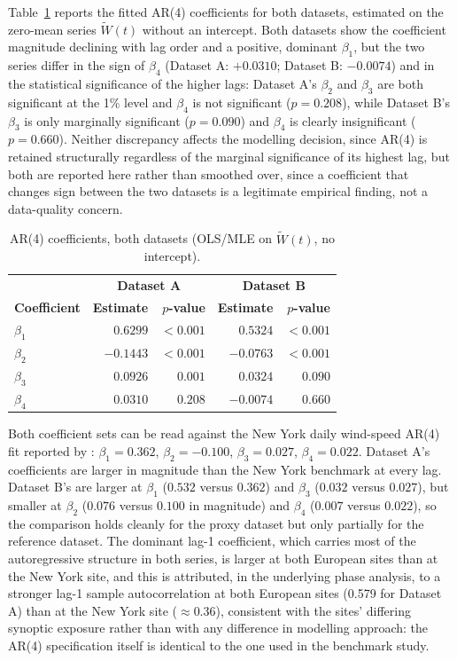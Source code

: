 \documentclass[11pt, a4paper, twoside]{article}
\begin{document}
Table~\ref{tab:ar4} reports the fitted AR(4) coefficients for both datasets, estimated on the zero-mean series $\widetilde W(t)$ without an intercept. Both datasets show the coefficient magnitude declining with lag order and a positive, dominant $\beta_1$, but the two series differ in the sign of $\beta_4$ (Dataset A: $+0.0310$; Dataset B: $-0.0074$) and in the statistical significance of the higher lags: Dataset A's $\beta_2$ and $\beta_3$ are both significant at the 1\% level and $\beta_4$ is not significant ($p = 0.208$), while Dataset B's $\beta_3$ is only marginally significant ($p = 0.090$) and $\beta_4$ is clearly insignificant ($p = 0.660$). Neither discrepancy affects the modelling decision, since AR(4) is retained structurally regardless of the marginal significance of its highest lag, but both are reported here rather than smoothed over, since a coefficient that changes sign between the two datasets is a legitimate empirical finding, not a data-quality concern.

\begin{table}[htbp]
\centering
\caption{AR(4) coefficients, both datasets (OLS/MLE on $\widetilde W(t)$, no intercept).}
\label{tab:ar4}
\begin{tabular}{l r r r r}
\toprule
& \multicolumn{2}{c}{\textbf{Dataset A}} & \multicolumn{2}{c}{\textbf{Dataset B}} \\
\textbf{Coefficient} & \textbf{Estimate} & \textbf{$p$-value} & \textbf{Estimate} & \textbf{$p$-value} \\
\midrule
$\beta_1$ & $0.6299$ & $<0.001$ & $0.5324$ & $<0.001$ \\
$\beta_2$ & $-0.1443$ & $<0.001$ & $-0.0763$ & $<0.001$ \\
$\beta_3$ & $0.0926$ & $0.001$ & $0.0324$ & $0.090$ \\
$\beta_4$ & $0.0310$ & $0.208$ & $-0.0074$ & $0.660$ \\
\bottomrule
\end{tabular}
\end{table}

Both coefficient sets can be read against the New York daily wind-speed AR(4) fit reported by \citet{AlexandridisZapranis2013}: $\beta_1=0.362$, $\beta_2=-0.100$, $\beta_3=0.027$, $\beta_4=0.022$. Dataset A's coefficients are larger in magnitude than the New York benchmark at every lag. Dataset B's are larger at $\beta_1$ ($0.532$ versus $0.362$) and $\beta_3$ ($0.032$ versus $0.027$), but smaller at $\beta_2$ ($0.076$ versus $0.100$ in magnitude) and $\beta_4$ ($0.007$ versus $0.022$), so the comparison holds cleanly for the proxy dataset but only partially for the reference dataset. The dominant lag-1 coefficient, which carries most of the autoregressive structure in both series, is larger at both European sites than at the New York site, and this is attributed, in the underlying phase analysis, to a stronger lag-1 sample autocorrelation at both European sites (0.579 for Dataset A) than at the New York site ($\approx 0.36$), consistent with the sites' differing synoptic exposure rather than with any difference in modelling approach: the AR(4) specification itself is identical to the one used in the benchmark study.
\end{document}
